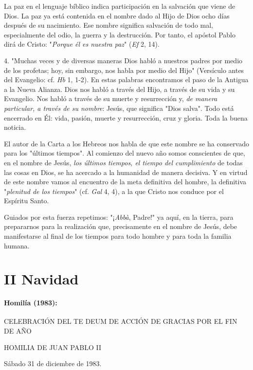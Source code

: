 \begin{body}
La paz en el lenguaje bíblico indica participación en la salvación que viene de Dios. La paz ya está contenida en el nombre dado al Hijo de Dios ocho días después de su nacimiento. Ese nombre significa salvación de todo mal, especialmente del odio, la guerra y la destrucción. Por tanto, el apóstol Pablo dirá de Cristo: "\emph{Porque él es nuestra paz}" (\emph{Ef} 2, 14).

4. "Muchas veces y de diversas maneras Dios habló a nuestros padres por medio de los profetas; hoy, sin embargo, nos habla por medio del Hijo" (Versículo antes del Evangelio: cf. \emph{Hb} 1, 1-2). En estas palabras encontramos el paso de la Antigua a la Nueva Alianza. Dios nos habló a través del Hijo, a través de su vida y su Evangelio. Nos habló a través de su muerte y resurrección y, \emph{de manera particular, a través de su nombre}: Jesús, que significa "Dios salva". Todo está encerrado en Él: vida, pasión, muerte y resurrección, cruz y gloria. Toda la buena noticia.

El autor de la Carta a los Hebreos nos habla de que este nombre se ha conservado para los "últimos tiempos". Al comienzo del nuevo año somos conscientes de que, en el nombre de Jesús, \emph{los últimos tiempos, el tiempo del cumplimiento} de todas las cosas en Dios, se ha acercado a la humanidad de manera decisiva. Y en virtud de este nombre vamos al encuentro de la meta definitiva del hombre, la definitiva "\emph{plenitud de los tiempos}" (cf. \emph{Gal} 4, 4), a la que Cristo nos conduce por el Espíritu Santo.

Guiados por esta fuerza repetimos: "¡\emph{Abbà}, Padre!" ya aquí, en la tierra, para prepararnos para la realización que, precisamente en el nombre de Jesús, debe manifestarse al final de los tiempos para todo hombre y para toda la familia humana.



\chapter{II Navidad}

\subsubsection{Homilía (1983): }

CELEBRACIÓN DEL TE DEUM DE ACCIÓN DE GRACIAS POR EL FIN DE AÑO

HOMILIA DE JUAN PABLO II

Sábado 31 de diciembre de 1983.


\end{body}
